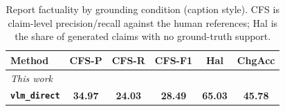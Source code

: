 \begin{table}[t]
\centering
\caption{Report factuality by grounding condition (caption style). CFS is claim-level precision/recall against the human references; Hal is the share of generated claims with no ground-truth support.}
\label{tab:factuality_caption}
\setlength{\tabcolsep}{3pt}
\begin{tabular}{lccccc}
\toprule
Method & CFS-P & CFS-R & CFS-F1 & Hal & ChgAcc \\
\midrule
\multicolumn{6}{l}{\emph{This work}} \\
\textbf{\texttt{vlm\_direct}} & \textbf{34.97} & \textbf{24.03} & \textbf{28.49} & \textbf{65.03} & \textbf{45.78} \\
\bottomrule
\end{tabular}
\end{table}
